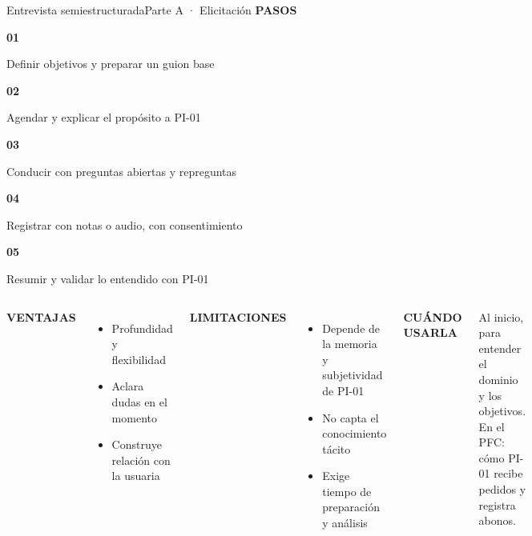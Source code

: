 \documentclass[aspectratio=169,11pt,t]{beamer}
\newcommand{\etiqueta}[1]{{\color{acento}\scriptsize\bfseries\MakeUppercase{#1}}\par\vspace{3pt}}
\newcommand{\paso}[2]{\parbox[t]{0.178\textwidth}{\raggedright\color{acento}\large\bfseries #1\par\vspace{2pt}\color{tinta}\scriptsize #2}}
\begin{document}
	\begin{frame}{Entrevista semiestructurada}{Parte A · Elicitación}
		\etiqueta{Pasos}
		\noindent\paso{01}{Definir objetivos y preparar un guion base}\hfill
		\paso{02}{Agendar y explicar el propósito a PI-01}\hfill
		\paso{03}{Conducir con preguntas abiertas y repreguntas}\hfill
		\paso{04}{Registrar con notas o audio, con consentimiento}\hfill
		\paso{05}{Resumir y validar lo entendido con PI-01}
		\vspace{10pt}
		\begin{columns}[T]
			\etiqueta{Ventajas}
			\footnotesize\begin{itemize}
				\item Profundidad y flexibilidad
				\item Aclara dudas en el momento
				\item Construye relación con la usuaria
			\end{itemize}
			\etiqueta{Limitaciones}
			\footnotesize\begin{itemize}
				\item Depende de la memoria y subjetividad de PI-01
				\item No capta el conocimiento tácito
				\item Exige tiempo de preparación y análisis
			\end{itemize}
			\etiqueta{Cuándo usarla}
			\footnotesize Al inicio, para entender el dominio y los objetivos. En el PFC: cómo PI-01 recibe pedidos y registra abonos.
		\end{columns}
	\end{frame}
	
\end{document}
